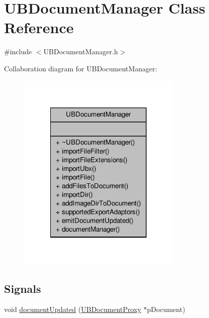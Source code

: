 \hypertarget{class_u_b_document_manager}{\section{U\-B\-Document\-Manager Class Reference}
\label{d2/da1/class_u_b_document_manager}
}


{\ttfamily \#include $<$U\-B\-Document\-Manager.\-h$>$}



Collaboration diagram for U\-B\-Document\-Manager\-:
\nopagebreak
\begin{figure}[H]
\begin{center}
\leavevmode
\includegraphics[width=222pt]{dd/d7a/class_u_b_document_manager__coll__graph}
\end{center}
\end{figure}
\subsection*{Signals}
\begin{DoxyCompactItemize}
\item 
void \hyperlink{class_u_b_document_manager_a0e26ccb4bc2fafa07f56ad5985154fbe}{document\-Updated} (\hyperlink{class_u_b_document_proxy}{U\-B\-Document\-Proxy} $\ast$p\-Document)
\end{DoxyCompactItemize}
